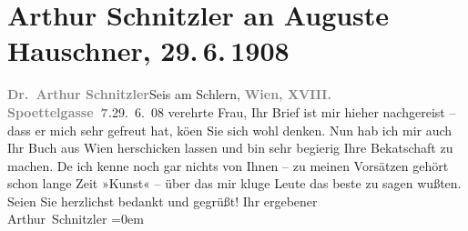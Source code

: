 

         
         \renewcommand{\erwaehntePersonen}{Personen: Auguste Hauschner}
         \renewcommand{\erwaehnteOrte}{Orte: Berlin, Edmund-Weiß-Gasse, Seis am Schlern, Wien}
         \renewcommand{\erwaehnteWerke}{Werke: Die Familie Lowositz. Roman, Kunst. Roman}
               \section[Arthur Schnitzler an Auguste Hauschner, 29. 6. 1908]{ Arthur Schnitzler an Auguste Hauschner, 29. 6. 1908}\nopagebreak{}\rehead{ }\begin{ledgroupsized}[t]{13cm}\normalsize\beginnumbering{} \toendnotes[C]{\smallbreak\pagebreak[2]} 
\toendnotes[C]{\smallbreak}\pstart
           \noindent{}{\pb}\textcolor{gray}{\textbf{Dr. Arthur Schnitzler}}\hfill Seis am Schlern,\pend
           \pstart
           \textcolor{gray}{\textbf{Wien, XVIII. Spoettelgasse 7.}}\hfill 29. 6. 08\pend
           \pstart
           verehrte Frau, Ihr Brief ist mir hieher nachgereist – dass er mich
               sehr gefreut hat, kö{\geminationn}en Sie sich wohl denken. Nun hab
               ich mir auch Ihr Buch aus Wien herschicken lassen und bin sehr begierig Ihre
                  Beka{\geminationn}tschaft zu machen. De{\geminationn} ich kenne noch gar nichts von Ihnen – zu meinen
               Vorsätzen {\pb}gehört schon lange Zeit
                  »Kunst« – über das mir kluge Leute das beste
               zu sagen wußten. Seien Sie herzlichst bedankt und gegrüßt!\pend
           \pstart
           Ihr ergebener{\\[\baselineskip]}\spacefill\mbox{Arthur Schnitzler}\pend
           \leftskip=0em{}
         
         \endnumbering{}\end{ledgroupsized}  \newcommand{\dateiname}{L02600}\newcommand{\titel}{Arthur Schnitzler an Auguste Hauschner, 29. 6. 1908}\newcommand{\editorInnen}{Martin Anton Müller und Laura Untner}
      